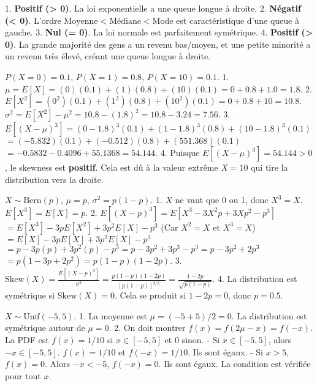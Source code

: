 \begin{correctionbox}
1.  \textbf{Positif (> 0)}. La loi exponentielle a une queue longue à droite.
2.  \textbf{Négatif (< 0)}. L'ordre $\text{Moyenne} < \text{Médiane} < \text{Mode}$ est caractéristique d'une queue à gauche.
3.  \textbf{Nul (= 0)}. La loi normale est parfaitement symétrique.
4.  \textbf{Positif (> 0)}. La grande majorité des gens a un revenu bas/moyen, et une petite minorité a un revenu très élevé, créant une queue longue à droite.
\end{correctionbox}

\begin{correctionbox}
$P(X=0)=0.1$, $P(X=1)=0.8$, $P(X=10)=0.1$.
1.  $\mu = E[X] = (0)(0.1) + (1)(0.8) + (10)(0.1) = 0 + 0.8 + 1.0 = 1.8$.
2.  $E[X^2] = (0^2)(0.1) + (1^2)(0.8) + (10^2)(0.1) = 0 + 0.8 + 10 = 10.8$.
    $\sigma^2 = E[X^2] - \mu^2 = 10.8 - (1.8)^2 = 10.8 - 3.24 = 7.56$.
3.  $E[(X-\mu)^3] = (0-1.8)^3(0.1) + (1-1.8)^3(0.8) + (10-1.8)^3(0.1)$
    $= (-5.832)(0.1) + (-0.512)(0.8) + (551.368)(0.1)$
    $= -0.5832 - 0.4096 + 55.1368 = 54.144$.
4.  Puisque $E[(X-\mu)^3] = 54.144 > 0$, le skewness est \textbf{positif}. Cela est dû à la valeur extrême $X=10$ qui tire la distribution vers la droite.
\end{correctionbox}

\begin{correctionbox}
$X \sim \text{Bern}(p)$, $\mu=p$, $\sigma^2=p(1-p)$.
1.  $X$ ne vaut que 0 ou 1, donc $X^3 = X$. $E[X^3] = E[X] = p$.
2.  $E[(X-p)^3] = E[X^3 - 3X^2p + 3Xp^2 - p^3]$
    $= E[X^3] - 3pE[X^2] + 3p^2E[X] - p^3$
    (Car $X^2=X$ et $X^3=X$)
    $= E[X] - 3pE[X] + 3p^2E[X] - p^3$
    $= p - 3p(p) + 3p^2(p) - p^3 = p - 3p^2 + 3p^3 - p^3 = p - 3p^2 + 2p^3$
    $= p(1 - 3p + 2p^2) = p(1-p)(1-2p)$.
3.  $\text{Skew}(X) = \frac{E[(X-p)^3]}{\sigma^3} = \frac{p(1-p)(1-2p)}{[p(1-p)]^{3/2}} = \frac{1-2p}{\sqrt{p(1-p)}}$.
4.  La distribution est symétrique si $\text{Skew}(X) = 0$. Cela se produit si $1-2p = 0$, donc $p=0.5$.
\end{correctionbox}


\begin{correctionbox}
$X \sim \text{Unif}(-5, 5)$.
1.  La moyenne est $\mu = (-5+5)/2 = 0$. La distribution est symétrique autour de $\mu=0$.
2.  On doit montrer $f(x) = f(2\mu - x) = f(-x)$.
    La PDF est $f(x) = 1/10$ si $x \in [-5, 5]$ et $0$ sinon.
    - Si $x \in [-5, 5]$, alors $-x \in [-5, 5]$. $f(x) = 1/10$ et $f(-x) = 1/10$. Ils sont égaux.
    - Si $x > 5$, $f(x) = 0$. Alors $-x < -5$, $f(-x) = 0$. Ils sont égaux.
    La condition est vérifiée pour tout $x$.
\end{correctionbox}

